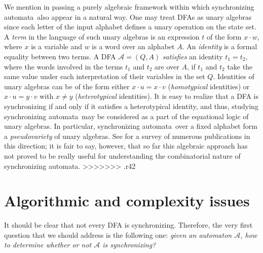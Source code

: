 \documentclass{irmaart}
\newcommand{\sa}{synchronizing au\-tom\-a\-ta}
\theoremstyle{plain}
\begin{document}
We mention in passing a purely algebraic framework within which \sa\ also appear in a natural way. One
may treat DFAs as unary algebras since each letter of the input
alphabet defines a unary operation on the state set. A
\emph{term} in the language of such unary
algebras is an expression $t$ of the form $x\cdot w$, where $x$ is
a variable and $w$ is a word over an alphabet $A$. An
\emph{identity} is a formal
equality between two terms. A DFA $\mathcal{A}=(Q,A)$
\emph{satisfies} an identity $t_1=t_2$, where the words involved
in the terms $t_1$ and $t_2$ are over $A$, if $t_1$ and $t_2$ take
the same value under each interpretation of their variables in the
set $Q$. Identities of unary algebras can be of the form either
$x\cdot u=x\cdot v$ (\emph{homotypical} identities) or $x\cdot u=y\cdot v$ with $x\ne
y$ (\emph{heterotypical} identities). It is easy to realize that a DFA is
synchronizing if and only if it satisfies a heterotypical
identity, and thus, studying \sa\ may be considered as a part of
the equational logic of unary algebras. In particular, \sa\ over a
fixed alphabet form a \emph{pseudovariety} of unary algebras. See
\cite{Bogdanovic&Imreh&Ciric&Petkovic:1999} for a survey of
numerous publications in this direction; it is fair to say,
however, that so far this algebraic approach has not proved to be
really useful for understanding the combinatorial nature of \sa.
>>>>>>> .r42

\section{Algorithmic and complexity issues}
\label{KV:sec:algorithms&complexity}
It should be clear that not every DFA is synchronizing. Therefore, the very
first question that we should address is the following one: \emph{given an
automaton $\mathcal{A}$, how to determine whether or not $\mathcal{A}$ is
synchronizing?}
\end{document}
